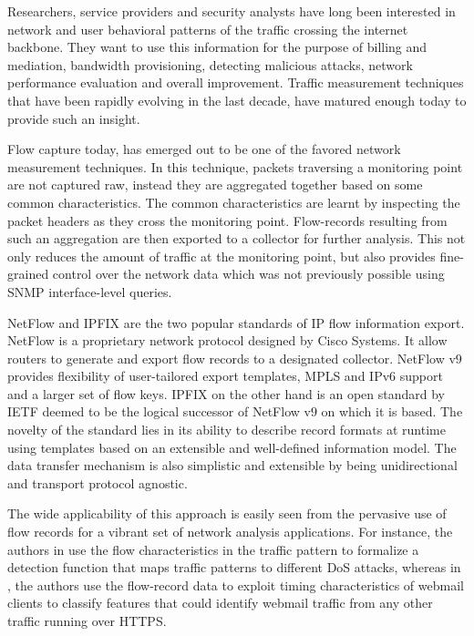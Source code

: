 Researchers, service providers and security analysts have long been interested
in network and user behavioral patterns of the traffic crossing the internet
backbone. They want to use this information for the purpose of billing and
mediation, bandwidth provisioning, detecting malicious attacks, network
performance evaluation and overall improvement. Traffic measurement techniques
that have been rapidly evolving in the last decade, have matured enough today
to provide such an insight.

Flow capture today, has emerged out to be one of the favored network
measurement techniques. In this technique, packets traversing a monitoring
point are not captured raw, instead they are aggregated together based on some
common characteristics. The common characteristics are learnt by inspecting
the packet headers as they cross the monitoring point. Flow-records resulting
from such an aggregation are then exported to a collector for further
analysis. This not only reduces the amount of traffic at the monitoring point,
but also provides fine-grained control over the network data which was not
previously possible using SNMP interface-level queries.

NetFlow and \ac{IPFIX} are the two popular standards of IP flow information
export. NetFlow \cite{rfc3954} is a proprietary network protocol designed by
Cisco Systems. It allow routers to generate and export flow records to a
designated collector. NetFlow v$9$ provides flexibility of user-tailored
export templates, \ac{MPLS} and IPv$6$ support and a larger set of flow keys.
\ac{IPFIX} \cite{rfc5101} on the other hand is an open standard by IETF deemed
to be the logical successor of NetFlow v$9$ on which it is based. The novelty
of the standard lies in its ability to describe record formats at runtime
using templates based on an extensible and well-defined information model. The
data transfer mechanism is also simplistic and extensible by being
unidirectional and transport protocol agnostic.

The wide applicability of this approach is easily seen from the pervasive use
of flow records for a vibrant set of network analysis applications. For
instance, the authors in \cite{mkim:2004} use the flow characteristics in the
traffic pattern to formalize a detection function that maps traffic patterns
to different DoS attacks, whereas in \cite{sdominik:2010}, the authors
use the flow-record data to exploit timing characteristics of webmail clients
to classify features that could identify webmail traffic from any other
traffic running over HTTPS.

